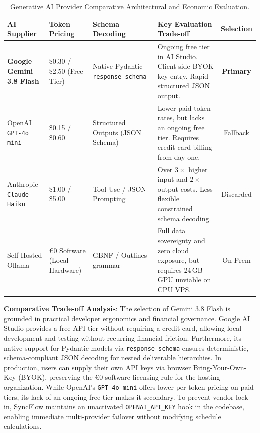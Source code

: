 \begin{table}[H]
\centering
\scriptsize
\setlength{\tabcolsep}{3.5pt}
\renewcommand{\arraystretch}{1.10}
\caption*{Generative AI Provider Comparative Architectural and Economic Evaluation.}
\begin{tabularx}{\textwidth}{>{\raggedright\arraybackslash}p{2.6cm} >{\raggedright\arraybackslash}p{2.5cm} >{\raggedright\arraybackslash}p{2.6cm} >{\raggedright\arraybackslash}X c}
\toprule
\textbf{AI Supplier} & \textbf{Token Pricing} & \textbf{Schema Decoding} & \textbf{Key Evaluation Trade-off} & \textbf{Selection} \\
\midrule
\textbf{Google Gemini 3.8 Flash} & \$0.30 / \$2.50 (Free Tier) & Native Pydantic \texttt{response\_schema} & Ongoing free tier in AI Studio. Client-side BYOK key entry. Rapid structured JSON output. & \textbf{Primary} \\
OpenAI \texttt{GPT-4o mini} & \$0.15 / \$0.60 & Structured Outputs (JSON Schema) & Lower paid token rates, but lacks an ongoing free tier. Requires credit card billing from day one. & Fallback \\
Anthropic \texttt{Claude Haiku} & \$1.00 / \$5.00 & Tool Use / JSON Prompting & Over $3\times$ higher input and $2\times$ output costs. Less flexible constrained schema decoding. & Discarded \\
Self-Hosted Ollama & €0 Software (Local Hardware) & GBNF / Outlines grammar & Full data sovereignty and zero cloud exposure, but requires 24\,GB GPU unviable on CPU VPS. & On-Prem \\
\bottomrule
\end{tabularx}
\end{table}

\noindent \textbf{Comparative Trade-off Analysis}: The selection of Gemini 3.8 Flash is grounded in practical developer ergonomics and financial governance. Google AI Studio provides a free API tier without requiring a credit card, allowing local development and testing without recurring financial friction. Furthermore, its native support for Pydantic models via \texttt{response\_schema} ensures deterministic, schema-compliant JSON decoding for nested deliverable hierarchies. In production, users can supply their own API keys via browser Bring-Your-Own-Key (BYOK), preserving the €0 software licensing rule for the hosting organization. While OpenAI's \texttt{GPT-4o mini} offers lower per-token pricing on paid tiers, its lack of an ongoing free tier makes it secondary. To prevent vendor lock-in, SyncFlow maintains an unactivated \texttt{OPENAI\_API\_KEY} hook in the codebase, enabling immediate multi-provider failover without modifying schedule calculations.

